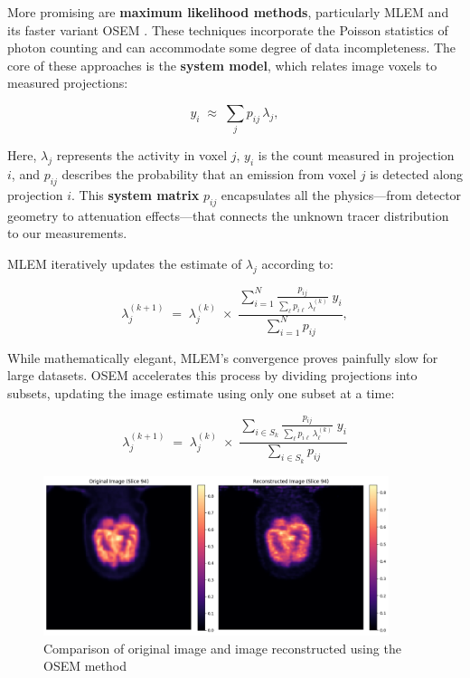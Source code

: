 \documentclass[
reprint,
superscriptaddress,
nofootinbib,
amsmath,amssymb,
aps,
prd,
]{revtex4-2}
\begin{document}
More promising are \textbf{maximum likelihood methods}, particularly MLEM and its faster variant OSEM \cite{363108}. These techniques incorporate the Poisson statistics of photon counting and can accommodate some degree of data incompleteness. The core of these approaches is the \textbf{system model}, which relates image voxels to measured projections:

\begin{equation}
    y_i \;\approx\; \sum_{j} p_{ij}\,\lambda_j,
\end{equation}

Here, $\lambda_j$ represents the activity in voxel $j$, $y_i$ is the count measured in projection $i$, and $p_{ij}$ describes the probability that an emission from voxel $j$ is detected along projection $i$. This \textbf{system matrix} $p_{ij}$ encapsulates all the physics—from detector geometry to attenuation effects—that connects the unknown tracer distribution to our measurements.

MLEM iteratively updates the estimate of $\lambda_j$ according to:

\begin{equation}
    \lambda_j^{(k+1)}
    \;=\;
    \lambda_j^{(k)}
    \;\times\;
    \frac{\displaystyle \sum_{i=1}^{N} \frac{p_{ij}}{\sum_{\ell} p_{i\ell}\,\lambda_{\ell}^{(k)}} \; y_i}
    {\displaystyle \sum_{i=1}^{N} p_{ij}}  ,
\end{equation}

While mathematically elegant, MLEM's convergence proves painfully slow for large datasets. OSEM accelerates this process by dividing projections into subsets, updating the image estimate using only one subset at a time:

\begin{equation}
    \lambda_j^{(k+1)}
\;=\;
\lambda_j^{(k)}
\;\times\;
\frac{\displaystyle \sum_{i \in S_{k}} \frac{p_{ij}}{\sum_{\ell} p_{i\ell}\,\lambda_{\ell}^{(k)}} \; y_i}
{\displaystyle \sum_{i \in S_{k}} p_{ij}}
\end{equation}

\begin{figure}[htbp]
    \centering
    \vspace{-0.2cm}
    \includegraphics[width=0.9\textwidth]{Images/output}
    \vspace{-0.2cm}
    \caption{Comparison of original image and image reconstructed using the OSEM method}
    \vspace{-0.2cm}
    \label{fig:pet_reconstruction}
\end{figure}
\end{document}
